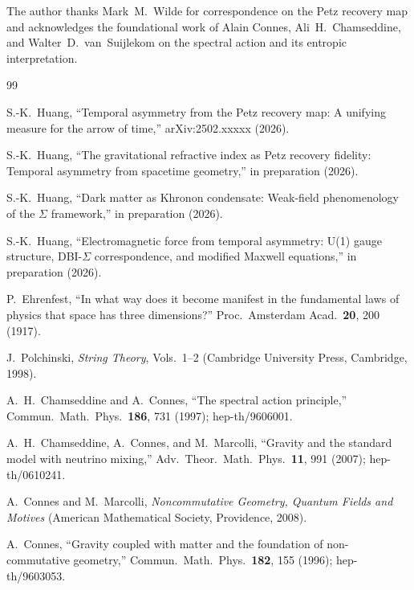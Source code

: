 \documentclass[prd,twocolumn,superscriptaddress,longbibliography]{revtex4-2}
\begin{document}
\begin{acknowledgments}
The author thanks Mark~M.~Wilde for correspondence
on the Petz recovery map and acknowledges the foundational
work of Alain Connes, Ali~H.~Chamseddine, and
Walter~D.~van~Suijlekom on the spectral action and its
entropic interpretation.
\end{acknowledgments}


\begin{thebibliography}{99}

S.-K.~Huang,
``Temporal asymmetry from the Petz recovery map:
A unifying measure for the arrow of time,''
arXiv:2502.xxxxx (2026).

S.-K.~Huang,
``The gravitational refractive index as Petz recovery
fidelity: Temporal asymmetry from spacetime geometry,''
in preparation (2026).

S.-K.~Huang,
``Dark matter as Khronon condensate: Weak-field
phenomenology of the $\Sigma$ framework,''
in preparation (2026).

S.-K.~Huang,
``Electromagnetic force from temporal asymmetry: U(1)
gauge structure, DBI-$\Sigma$ correspondence, and
modified Maxwell equations,''
in preparation (2026).

P.~Ehrenfest,
``In what way does it become manifest in the fundamental
laws of physics that space has three dimensions?''
Proc.\ Amsterdam Acad.\ \textbf{20}, 200 (1917).

J.~Polchinski,
\emph{String Theory}, Vols.\ 1--2
(Cambridge University Press, Cambridge, 1998).

A.~H.~Chamseddine and A.~Connes,
``The spectral action principle,''
Commun.\ Math.\ Phys.\ \textbf{186}, 731 (1997);
hep-th/9606001.

A.~H.~Chamseddine, A.~Connes, and M.~Marcolli,
``Gravity and the standard model with neutrino mixing,''
Adv.\ Theor.\ Math.\ Phys.\ \textbf{11}, 991 (2007);
hep-th/0610241.

A.~Connes and M.~Marcolli,
\emph{Noncommutative Geometry, Quantum Fields and Motives}
(American Mathematical Society, Providence, 2008).

A.~Connes,
``Gravity coupled with matter and the foundation of
non-commutative geometry,''
Commun.\ Math.\ Phys.\ \textbf{182}, 155 (1996);
hep-th/9603053.


\end{thebibliography}
\end{document}
